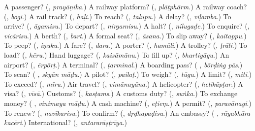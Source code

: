 \begin{tcolorbox}[breakable,colback=teal!4,colframe=teal!35!black,title={Before you move on}]
A passenger? (\textbf{}, \emph{prayāṇika}.) A railway platform? (\textbf{}, \emph{plāṭphārm}.) A railway coach? (\textbf{}, \emph{bōgi}.) A rail track? (\textbf{}, \emph{haḷi}.) To reach? (\textbf{}, \emph{talupu}.) A delay? (\textbf{}, \emph{viḷamba}.) To arrive? (\textbf{}, \emph{āgamisu}.) To depart? (\textbf{}, \emph{nirgamisu}.) A halt? (\textbf{}, \emph{nilugaḍe}.) To enquire? (\textbf{}, \emph{vicārisu}.) A berth? (\textbf{}, \emph{bart}.) A formal seat? (\textbf{}, \emph{āsana}.) To slip away? (\textbf{}, \emph{kaitappu}.) To peep? (\textbf{}, \emph{iṇuku}.) A fare? (\textbf{}, \emph{dara}.) A porter? (\textbf{}, \emph{hamāli}.) A trolley? (\textbf{}, \emph{ṭrāli}.) To load? (\textbf{}, \emph{hēru}.) Hand luggage? (\textbf{}, \emph{kaisāmānu}.) To fill up? (\textbf{}, \emph{bhartiyāgu}.) An airport? (\textbf{}, \emph{ērpōrṭ}.) A terminal? (\textbf{}, \emph{ṭarminal}.) A boarding pass? (\textbf{ }, \emph{bōrḍiṅg pās}.) To scan? (\textbf{ }, \emph{skyān māḍu}.) A pilot? (\textbf{}, \emph{pailaṭ}.) To weigh? (\textbf{}, \emph{tūgu}.) A limit? (\textbf{}, \emph{miti}.) To exceed? (\textbf{}, \emph{mīru}.) Air travel? (\textbf{}, \emph{vimānayāna}.) A helicopter? (\textbf{}, \emph{helikāpṭar}.) A visa? (\textbf{}, \emph{vīsā}.) Customs? (\textbf{}, \emph{kasṭams}.) A customs duty? (\textbf{}, \emph{suṅka}.) To exchange money? (\textbf{ }, \emph{vinimaya māḍu}.) A cash machine? (\textbf{}, \emph{eṭieṃ}.) A permit? (\textbf{}, \emph{paravānagi}.) To renew? (\textbf{}, \emph{navīkarisu}.) To confirm? (\textbf{}, \emph{dṛḍhapaḍisu}.) An embassy? (\textbf{ }, \emph{rāyabhāra kacēri}.) International? (\textbf{}, \emph{antararāṣṭrīya}.)
\end{tcolorbox}
